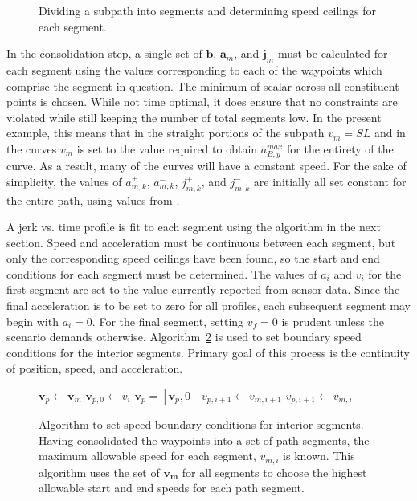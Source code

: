 \documentclass[letterpaper, 10 pt, conference]{ieeeconf}  %
\begin{document}
\begin{figure}[thpb]
{  }
  \caption{Dividing a subpath into segments and determining speed ceilings for each segment.}
  \label{fig:1Dto2DandSegmentation}
\end{figure}

In the consolidation step, a single set of $\mathbf{b}$, $\mathbf{a}_m$, and $\mathbf{j}_m$ 
must be calculated for each segment using the values corresponding to each of the waypoints which comprise the segment in question.
The minimum of scalar across all constituent points is chosen.
While not time optimal, it does ensure that no constraints are violated while still keeping the number of total segments low.
In the present example, this means that in the straight portions of the subpath $v_m = SL$ and in the curves $v_m$ is set to the value required to obtain $a_{B,y}^{max}$ for the entirety of the curve.
As a result, many of the curves will have a constant speed.
For the sake of simplicity, the values of $a^+_{m,k}$, $a^-_{m,k}$, $j^+_{m,k}$, and $j^-_{m,k}$ are initially all set constant for the entire path, using values from \cite{Maurya2012,Hoberock1977,Long2000}.

A jerk vs. time profile is fit to each segment using the algorithm in the next section.
Speed and acceleration must be continuous between each segment, but only the corresponding speed ceilings have been found, so the start and end conditions for each segment must be determined.
The values of $a_i$ and $v_i$ for the first segment are set to the value currently reported from sensor data.
Since the final acceleration is to be set to zero for all profiles, each subsequent segment may begin with $a_i = 0$.
For the final segment, setting $v_f = 0$ is prudent unless the scenario demands otherwise.
Algorithm~\ref{alg:segmentspeedboundaryconditions} is used to set boundary speed conditions for the interior segments. 
Primary goal of this process is the continuity of position, speed, and acceleration.

\begin{figure}
  \begin{algorithmic}[1]
      \State $\mathbf{v}_p \gets \mathbf{v}_m$ 
      \State $\mathbf{v}_{p,0} \gets v_i$ 
      \State $\mathbf{v}_p = [\mathbf{v}_p, 0]$ 
          \State $v_{p,i+1} \gets v_{m,i+1}$
        \Else
          \State $v_{p,i+1} \gets v_{m,i}$
        \EndIf
      \EndFor
    \EndProcedure
  \end{algorithmic}
  \caption{
    Algorithm to set speed boundary conditions for interior segments.
    Having consolidated the waypoints into a set of path segments, the maximum allowable speed for each segment, $v_{m,i}$ is known.
    This algorithm uses the set of $\mathbf{v_{m}}$ for all segments to choose the highest allowable start and end speeds for each path segment.
  }
\label{alg:segmentspeedboundaryconditions}
\end{figure}
\end{document}
